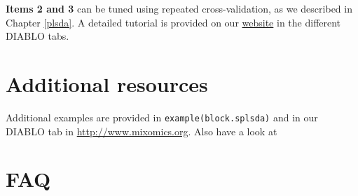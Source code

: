 \documentclass[]{book}
\theoremstyle{definition}
\theoremstyle{definition}
\theoremstyle{definition}
\theoremstyle{remark}
\begin{document}
\textbf{Items 2 and 3} can be tuned using repeated cross-validation, as
we described in Chapter \ref{plsda}. A detailed tutorial is provided on
our \href{http://mixomics.org/mixdiablo/}{website} in the different
DIABLO tabs.

\section{Additional resources}\label{additional-resources-3}

Additional examples are provided in \texttt{example(block.splsda)} and
in our DIABLO tab in \url{http://www.mixomics.org}. Also have a look at
\citep{Sin16}

\section{FAQ}\label{faq-3}
\end{document}

